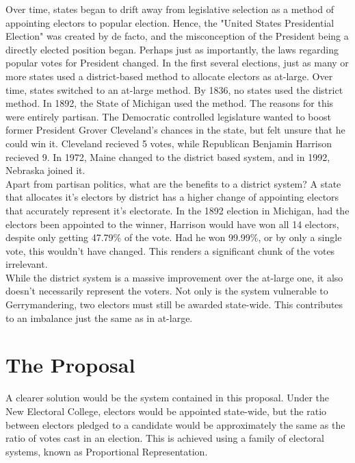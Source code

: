 \documentclass{article}
\begin{document}
    Over time, states began to drift away from legislative selection as a method of appointing electors to popular election. Hence, the "United States Presidential Election" was created by de facto, and the misconception of the President being a directly elected position began. Perhaps just as importantly, the laws regarding popular votes for President changed. In the first several elections, just as many or more states used a district-based method to allocate electors as at-large. Over time, states switched to an at-large method. By 1836, no states used the district method. In 1892, the State of Michigan used the method. The reasons for this were entirely partisan. The Democratic controlled legislature wanted to boost former President Grover Cleveland's chances in the state, but felt unsure that he could win it. Cleveland recieved 5 votes, while Republican Benjamin Harrison recieved 9. In 1972, Maine changed to the district based system, and in 1992, Nebraska joined it. \\

    Apart from partisan politics, what are the benefits to a district system? A state that allocates it's electors by district has a higher change of appointing electors that accurately represent it's electorate. In the 1892 election in Michigan, had the electors been appointed to the winner, Harrison would have won all 14 electors, despite only getting 47.79\% of the vote. Had he won 99.99\%, or by only a single vote, this wouldn't have changed. This renders a significant chunk of the votes irrelevant. \\

    While the district system is a massive improvement over the at-large one, it also doesn't necessarily represent the voters. Not only is the system vulnerable to Gerrymandering, two electors must still be awarded state-wide. This contributes to an imbalance just the same as in at-large. \\

    \section{The Proposal}

    A clearer solution would be the system contained in this proposal. Under the New Electoral College, electors would be appointed state-wide, but the ratio between electors pledged to a candidate would be approximately the same as the ratio of votes cast in an election. This is achieved using a family of electoral systems, known as Proportional Representation. \\
\end{document}
